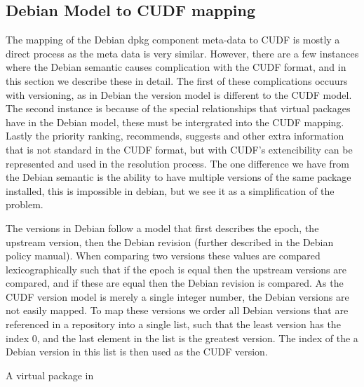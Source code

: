 

\subsection{Debian Model to CUDF mapping}
The mapping of the Debian dpkg component meta-data to CUDF is mostly a direct process as the meta data is very similar. 
However, there are a few instances where the Debian semantic causes complication with the CUDF format, and in this section we describe these in detail.
The first of these complications occuurs with versioning, as in Debian the version model is different to the CUDF model.
The second instance is because of the special relationships that virtual packages have in the Debian model, 
these must be intergrated into the CUDF mapping. 
Lastly the priority ranking, recommends, suggests and other extra information that is not standard in the CUDF format,
but with CUDF's extencibility can be represented and used in the resolution process.
The one difference we have from the Debian semantic is the ability to have multiple versions of the same package installed, this is impossible in debian, but we see it as a simplification of the problem.

The versions in Debian follow a model that first describes the epoch,
the upstream version, then the Debian revision (further described in the Debian policy manual). %
When comparing two versions these values are compared lexicographically such that
if the epoch is equal then the upstream versions are compared, 
and if these are equal then the Debian revision is compared.
As the CUDF version model is merely a single integer number, 
the Debian versions are not easily mapped.
To map these versions we order all Debian versions that are referenced in a repository into a single list, 
such that the least version has the index 0, and the last element in the list is the greatest version.
The index of the a Debian version in this list is then used as the CUDF version.

A virtual package in

